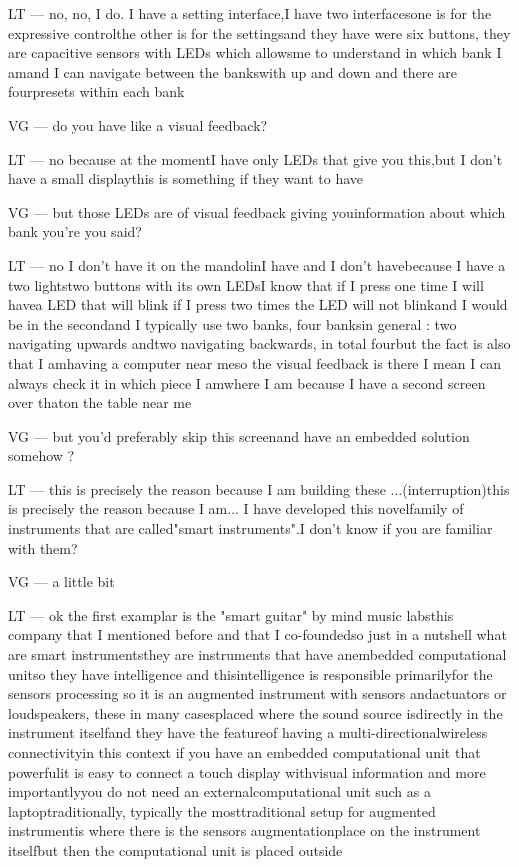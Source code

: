 LT — no, no, I do. I have a setting interface,I have two interfacesone is for the expressive controlthe other is for the settingsand they have were six buttons, they are capacitive sensors with LEDs which allowsme to understand in which bank I amand I can navigate between the bankswith up and down and there are fourpresets within each bank

VG — do you have like a visual feedback?

LT — no because at the momentI have only LEDs that give you this,but I don't have a small displaythis is something if they want to have

VG — but those LEDs are of visual feedback giving youinformation about which bank you're you said?

LT — no I don't have it on the mandolinI have and I don't havebecause I have a two lightstwo buttons with its own LEDsI know that if I press one time I will havea LED that will blink if I press two times the LED will not blinkand I would be in the secondand I typically use two banks, four banksin general : two navigating upwards andtwo navigating backwards, in total fourbut the fact is also that I amhaving a computer near meso the visual feedback is there I mean I can always check it in which piece I amwhere I am because I have a second screen over thaton the table near me

VG — but you'd preferably skip this screenand have an embedded solution somehow ?

LT — this is precisely the reason because I am building these ...(interruption)this is precisely the reason because I am... I have developed this novelfamily of instruments that are called"smart instruments".I don't know if you are familiar with them?

VG — a little bit

LT — ok the first examplar is the "smart guitar" by mind music labsthis company that I mentioned before and that I co-foundedso just in a nutshell what are smart instrumentsthey are instruments that have anembedded computational unitso they have intelligence and thisintelligence is responsible primarilyfor the sensors processing so it is an augmented instrument with sensors andactuators or loudspeakers, these in many casesplaced where the sound source isdirectly in the instrument itselfand they have the featureof having a multi-directionalwireless connectivityin this context if you have an embedded computational unit that powerfulit is easy to connect a touch display withvisual information and more importantlyyou do not need an externalcomputational unit such as a laptoptraditionally, typically the mosttraditional setup for augmented instrumentis where there is the sensors augmentationplace on the instrument itselfbut then the computational unit is placed outside

